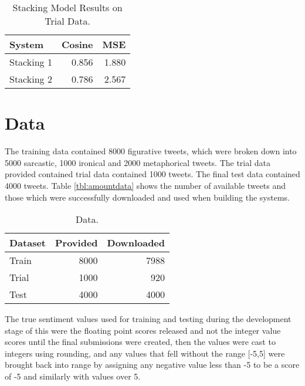 \documentclass[11pt,letterpaper]{article}
\begin{document}
\begin{table}[ht!]
\begin{center}
\begin{tabular}{|l|r|r|}
\hline
System & Cosine & MSE\\
\hline
Stacking 1 & 0.856 &1.880\\
Stacking 2 & 0.786 & 2.567\\
\hline
\end{tabular}
\end{center}
\caption{Stacking Model Results on Trial Data.}
\label{tbl:stackingResults}
\end{table}



\section{Data}
\label{sec:data}
The training data contained 8000 figurative tweets, which were broken down into 5000 sarcastic, 1000 ironical and 2000 metaphorical tweets. The trial data provided contained trial data contained 1000 tweets. The final test data contained 4000 tweets. Table \ref{tbl:amountdata} shows the number of available tweets and those which were successfully downloaded and used when building the systems.

\begin{table}[ht!]
\begin{center}
\begin{tabular}{|l|r|r|}
\hline
Dataset & Provided & Downloaded\\
\hline
Train & 8000  & 7988\\
Trial  & 1000  & 920   \\
Test  & 4000  & 4000  \\
\hline
\end{tabular}
\end{center}
\caption{Data.}
\label{tbl:amountData}
\end{table}

The true sentiment values used for training and testing during the development stage of this were the floating point scores released and not the integer value scores until the final submissions were created, then the values were cast to integers using rounding, and any values that fell without the range [-5,5] were brought back into range by assigning any negative value less than -5 to be a score of -5 and similarly with values over 5.
\end{document}
